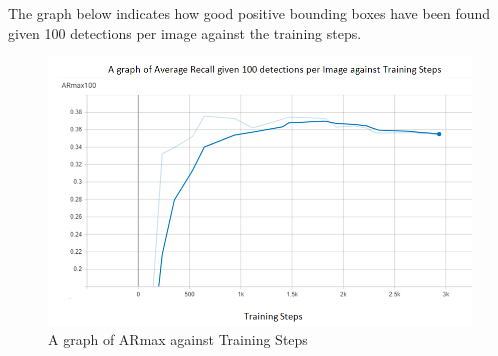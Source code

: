 \documentclass[12pt]{report}
\begin{document}
The graph below indicates how good positive bounding boxes have been found given 100 detections per image against the training steps.
\begin{figure}[H]\includegraphics[scale=0.6]{ARmax.png}\centering\caption{A graph of ARmax against Training Steps} \label{fig:ARmax against Training Steps} \end{figure}%
\end{document}
